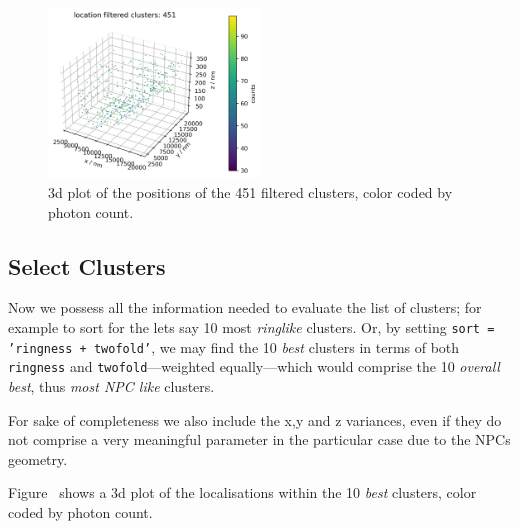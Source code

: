 \documentclass[11pt, a4paper, oneside, twocolumn]{report}
\renewcommand{\tt}{\texttt}
\newcommand{\e}{\emph}
\begin{document}
\begin{figure}[h!]
  \centering
  \includegraphics[width=0.5\textwidth]{7_filtered_clusters.png}
  \caption{3d plot of the positions of the 451 filtered clusters,
    color coded by photon count.}
  \label{f:7_filtered_clusters}
\end{figure}


\subsection{Select Clusters}

Now we possess all the information needed to evaluate the list of
clusters; for example to sort for the lets say 10 most \e{ringlike}
clusters. Or, by setting \tt{sort = 'ringness + twofold'}, we may find
the 10 \e{best} clusters in terms of both \tt{ringness} and
\tt{twofold}---weighted equally---which would comprise the 10
\e{overall best}, thus \e{most NPC like} clusters.

For sake of completeness we also include the x,y and z variances, even
if they do not comprise a very meaningful parameter in the particular
case due to the NPCs geometry.

Figure~\label{f:89_best_filtered_clusters} shows a 3d plot of the
localisations within the 10 \e{best} clusters, color coded by photon
count.


\end{document}
